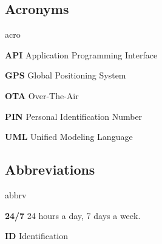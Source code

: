 \subsection{Acronyms}
	\begin{labeling}{acro}
		\item[\textbf{API}] Application Programming Interface
		\item[\textbf{GPS}] Global Positioning System
		\item[\textbf{OTA}] Over-The-Air
		\item[\textbf{PIN}] Personal Identification Number
		\item[\textbf{UML}] Unified Modeling Language
	\end{labeling}

\subsection{Abbreviations}
	\begin{labeling}{abbrv}
		\item[\textbf{24/7}] 24 hours a day, 7 days a week.
		\item[\textbf{ID}] Identification
	\end{labeling}